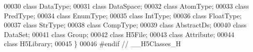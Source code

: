 \begin{DoxyCode}
00030         \textcolor{keyword}{class }DataType;
00031         \textcolor{keyword}{class }DataSpace;
00032         \textcolor{keyword}{class }AtomType;
00033         \textcolor{keyword}{class }PredType;
00034         \textcolor{keyword}{class }EnumType;
00035         \textcolor{keyword}{class }IntType;
00036         \textcolor{keyword}{class }FloatType;
00037         \textcolor{keyword}{class }StrType;
00038         \textcolor{keyword}{class }CompType;
00039         \textcolor{keyword}{class }AbstractDs;
00040         \textcolor{keyword}{class }DataSet;
00041         \textcolor{keyword}{class }Group;
00042         \textcolor{keyword}{class }H5File;
00043         \textcolor{keyword}{class }Attribute;
00044         \textcolor{keyword}{class }H5Library;
00045 \}
00046 \textcolor{preprocessor}{#endif // \_\_H5Classes\_H}
\end{DoxyCode}
